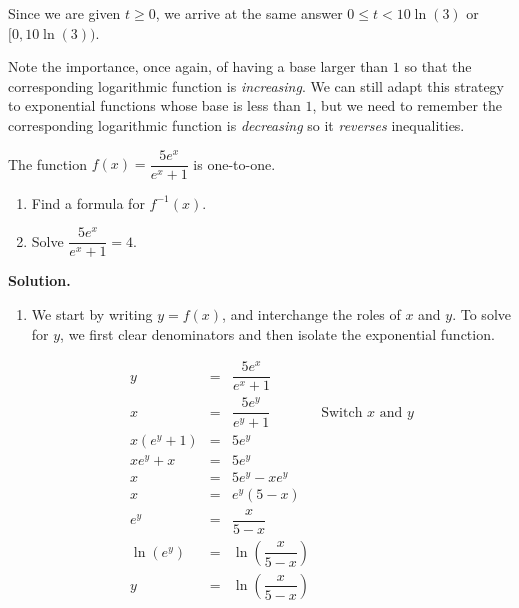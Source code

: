 \documentclass{ximera}
\begin{document}
Since we are given $t \geq 0$, we arrive at the same answer $0 \leq t < 10\ln(3)$ or $[0, 10 \ln(3))$.  

\smallskip

Note the importance, once again, of having a base larger than $1$ so that the corresponding logarithmic function is \textit{increasing}.  We can still adapt this strategy to exponential functions whose base is less than $1$, but we need to remember the corresponding logarithmic function is \textit{decreasing} so it \textit{reverses}  inequalities.  


\newpage

\begin{ex}  \label{expfracinverse} The function $f(x) = \dfrac{5e^{x}}{e^{x}+1}$ is one-to-one. 

\begin{multicols}{2} 

\begin{enumerate}

\item Find a formula for $f^{-1}(x)$.

\item  Solve $\dfrac{5e^{x}}{e^{x}+1} = 4$.

\end{enumerate}

\end{multicols}

{\bf Solution.}  \begin{enumerate} \item We start by writing $y=f(x)$, and interchange the roles of $x$ and $y$.  To solve for $y$, we first clear denominators and then isolate the exponential function.

\[ \begin{array}{rclr}
y & = & \dfrac{5e^{x}}{e^{x}+1} & \\ [12pt]
x & = & \dfrac{5e^{y}}{e^{y}+1} & \mbox{Switch $x$ and $y$} \\ [12pt]
x \left(e^{y}+1\right) & = & 5e^{y} & \\ [4pt]
x e^{y}+x & = & 5e^{y} & \\ [4pt]
x & = & 5e^{y} - x e^{y} & \\ [4pt]
x & = & e^{y}(5 - x) & \\ [4pt]
e^{y}& = & \dfrac{x}{5-x} & \\[12pt]
\ln\left(e^{y}\right) & = & \ln\left(\dfrac{x}{5-x}\right) & \\[12pt]
y & = & \ln\left(\dfrac{x}{5-x}\right) & \\
\end{array}\]


\end{enumerate}
\end{ex}
\end{document}
